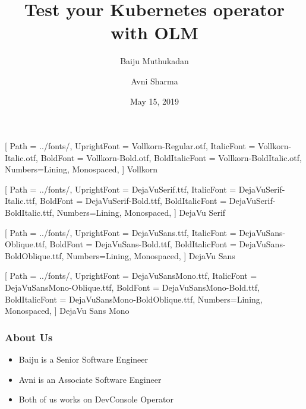 \documentclass[aspectratio=169]{beamer}
\title{Test your Kubernetes operator with OLM}
\author{Baiju Muthukadan \and Avni Sharma}
\date{May 15, 2019}
\begin{document}
\beamertemplatenavigationsymbolsempty

\setmainfont
[ Path = ../fonts/,
UprightFont = DejaVuSerif.ttf,
ItalicFont = DejaVuSerif-Italic.ttf,
BoldFont = DejaVuSerif-Bold.ttf,
BoldItalicFont = DejaVuSerif-BoldItalic.ttf,
Numbers={Lining, Monospaced},
] {DejaVu Serif}

\setsansfont
[ Path = ../fonts/,
UprightFont = DejaVuSans.ttf,
ItalicFont = DejaVuSans-Oblique.ttf,
BoldFont = DejaVuSans-Bold.ttf,
BoldItalicFont = DejaVuSans-BoldOblique.ttf,
Numbers={Lining, Monospaced},
] {DejaVu Sans}

\setmonofont
[ Path = ../fonts/,
UprightFont = DejaVuSansMono.ttf,
ItalicFont = DejaVuSansMono-Oblique.ttf,
BoldFont = DejaVuSansMono-Bold.ttf,
BoldItalicFont = DejaVuSansMono-BoldOblique.ttf,
Numbers={Lining, Monospaced},
] {DejaVu Sans Mono}


\newfontfamily{\vollkorn}
[ Path = ../fonts/,
UprightFont = Vollkorn-Regular.otf,
ItalicFont = Vollkorn-Italic.otf,
BoldFont = Vollkorn-Bold.otf,
BoldItalicFont = Vollkorn-BoldItalic.otf,
Numbers={Lining, Monospaced},
] {Vollkorn}

\newfontfamily{\dejavuserif}
[ Path = ../fonts/,
UprightFont = DejaVuSerif.ttf,
ItalicFont = DejaVuSerif-Italic.ttf,
BoldFont = DejaVuSerif-Bold.ttf,
BoldItalicFont = DejaVuSerif-BoldItalic.ttf,
Numbers={Lining, Monospaced},
] {DejaVu Serif}

\newfontfamily{\dejavusans}
[ Path = ../fonts/,
UprightFont = DejaVuSans.ttf,
ItalicFont = DejaVuSans-Oblique.ttf,
BoldFont = DejaVuSans-Bold.ttf,
BoldItalicFont = DejaVuSans-BoldOblique.ttf,
Numbers={Lining, Monospaced},
] {DejaVu Sans}

\newfontfamily{\dejavumono}
[ Path = ../fonts/,
UprightFont = DejaVuSansMono.ttf,
ItalicFont = DejaVuSansMono-Oblique.ttf,
BoldFont = DejaVuSansMono-Bold.ttf,
BoldItalicFont = DejaVuSansMono-BoldOblique.ttf,
Numbers={Lining, Monospaced},
] {DejaVu Sans Mono}

\frame{\titlepage}

\begin{frame}
  \frametitle{About Us}

  \begin{itemize}
  \item<1-> Baiju is a Senior Software Engineer
  \item<2-> Avni is an Associate Software Engineer
  \item<3-> Both of us works on DevConsole Operator
  \end{itemize}

\end{frame}
\end{document}
